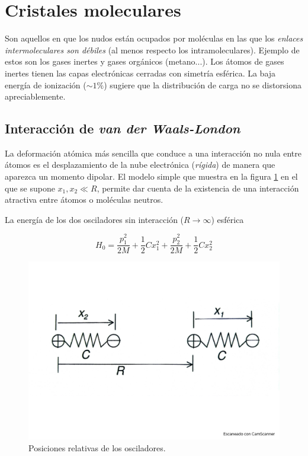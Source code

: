 \section{Cristales moleculares}

Son aquellos en que los nudos están ocupados por moléculas en las que los \textit{enlaces intermoleculares son débiles} (al menos respecto los intramoleculares). Ejemplo de estos son los gases inertes y gases orgánicos (metano...). Los átomos de gases inertes tienen las capas electrónicas cerradas con simetría esférica. La baja energía de ionización ($\sim 1 \%$) sugiere que la distribución de carga no se distorsiona apreciablemente. 


\subsection{Interacción de \textit{van der Waals-London}}


La deformación atómica más sencilla que conduce a una interacción no nula entre átomos es el desplazamiento de la nube electrónica (\textit{rígida}) de manera que aparezca un momento dipolar. El modelo simple que muestra en la figura \ref{Fig:03-02} en el que se supone $x_1,x_2\ll R$, permite dar cuenta de la existencia de una interacción atractiva entre átomos o moléculas neutros. 

La energía de los dos osciladores sin interacción ($R\rightarrow \infty$) esférica

\begin{equation}
    H_0 = \frac{p_1^2}{2M} + \frac{1}{2} Cx_1^2 + \frac{p_2^2}{2M} + \frac{1}{2} Cx_2^2
\end{equation}

\begin{figure}[h!] \centering
    \includegraphics[scale=0.5]{Cuerpo/Ch_03/Fotos libro 2.pdf}
    \caption{Posiciones relativas de los osciladores.}
    \label{Fig:03-02}
\end{figure}    

